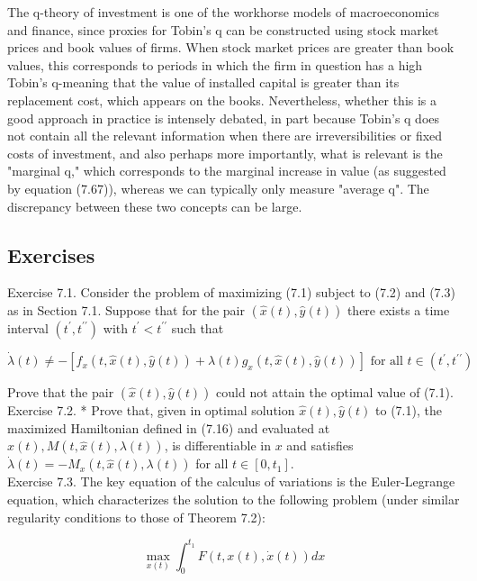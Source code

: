 \documentclass[\topdir/lecture_notes.tex]{subfiles}
\begin{document}
The q-theory of investment is one of the workhorse models of macroeconomics and finance, since proxies for Tobin's q can be constructed using stock market prices and book values of firms. When stock market prices are greater than book values, this corresponds to periods in which the firm in question has a high Tobin's q-meaning that the value of installed capital is greater than its replacement cost, which appears on the books. Nevertheless, whether this is a good approach in practice is intensely debated, in part because Tobin's q does not contain all the relevant information when there are irreversibilities or fixed costs of investment, and also perhaps more importantly, what is relevant is the "marginal q," which corresponds to the marginal increase in value (as suggested by equation (7.67)), whereas we can typically only measure "average q". The discrepancy between these two concepts can be large.






\subsection{Exercises}
Exercise 7.1. Consider the problem of maximizing (7.1) subject to (7.2) and (7.3) as in Section 7.1. Suppose that for the pair $(\hat{x}(t), \hat{y}(t))$ there exists a time interval $\left(t^{\prime}, t^{\prime \prime}\right)$ with $t^{\prime}<t^{\prime \prime}$ such that

\[
\dot{\lambda}(t) \neq-\left[f_{x}(t, \hat{x}(t), \hat{y}(t))+\lambda(t) g_{x}(t, \hat{x}(t), \hat{y}(t))\right] \text { for all } t \in\left(t^{\prime}, t^{\prime \prime}\right)
\]

Prove that the pair $(\hat{x}(t), \hat{y}(t))$ could not attain the optimal value of (7.1).\\
Exercise 7.2. * Prove that, given in optimal solution $\hat{x}(t), \hat{y}(t)$ to (7.1), the maximized Hamiltonian defined in (7.16) and evaluated at $\hat{x}(t), M(t, \hat{x}(t), \lambda(t))$, is differentiable in $x$ and satisfies $\dot{\lambda}(t)=-M_{x}(t, \hat{x}(t), \lambda(t))$ for all $t \in\left[0, t_{1}\right]$.\\
Exercise 7.3. The key equation of the calculus of variations is the Euler-Legrange equation, which characterizes the solution to the following problem (under similar regularity conditions to those of Theorem 7.2):

\[
\max _{x(t)} \int_{0}^{t_{1}} F(t, x(t), \dot{x}(t)) d x
\]
\end{document}
